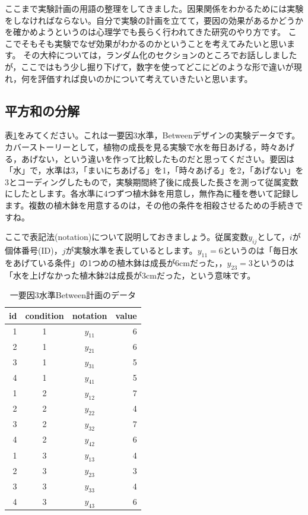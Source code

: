 \documentclass{ltjbook}
\begin{document}
ここまで実験計画の用語の整理をしてきました。因果関係をわかるためには実験をしなければならない。自分で実験の計画を立てて，要因の効果があるかどうかを確かめようというのは心理学でも長らく行われてきた研究のやり方です。
ここでそもそも実験でなぜ効果がわかるのかということを考えてみたいと思います。 その大枠については，ランダム化のセクションのところでお話ししましたが，ここではもう少し掘り下げて，数字を使ってどこにどのような形で違いが現れ，何を評価すれば良いのかについて考えていきたいと思います。

\subsection{平方和の分解}
表\ref{table::21_02}をみてください。これは一要因3水準，Betweenデザインの実験データです。カバーストーリーとして，植物の成長を見る実験で水を毎日あげる，時々あげる，あげない，という違いを作って比較したものだと思ってください。要因は「水」で，水準は3，「まいにちあげる」を1，「時々あげる」を2，「あげない」を3とコーディングしたもので，実験期間終了後に成長した長さを測って従属変数にしたとします。各水準に4つずつ植木鉢を用意し，無作為に種を巻いて記録します。複数の植木鉢を用意するのは，その他の条件を相殺させるための手続きですね。

ここで表記法(notation)について説明しておきましょう。従属変数$y_{ij}$として，$i$が個体番号(ID)，$j$が実験水準を表しているとします。$y_{11}=6$というのは「毎日水をあげている条件」の1つめの植木鉢は成長が6cmだった，，$y_{23}=3$というのは「水を上げなかった植木鉢2は成長が3cmだった，という意味です。

\begin{table}[ht]
    \centering
    \caption{一要因3水準Between計画のデータ}
    \begin{tabular}{rccr}
      \hline
    id & condition & notation & value \\ 
      \hline
      1 & 1 & $y_{11}$ & 6 \\ 
      2 & 1 & $y_{21}$ & 6 \\ 
      3 & 1 & $y_{31}$ & 5 \\ 
      4 & 1 & $y_{41}$ & 5 \\ 
      1 & 2 & $y_{12}$ & 7 \\ 
      2 & 2 & $y_{22}$ & 4 \\ 
      3 & 2 & $y_{32}$ & 7 \\ 
      4 & 2 & $y_{42}$ & 6 \\ 
      1 & 3 & $y_{13}$ & 4 \\ 
      2 & 3 & $y_{23}$ & 3 \\ 
      3 & 3 & $y_{33}$ & 4 \\ 
      4 & 3 & $y_{43}$ & 6 \\ 
       \hline
    \end{tabular}
    \label{table::21_02}
    \end{table}
\end{document}
